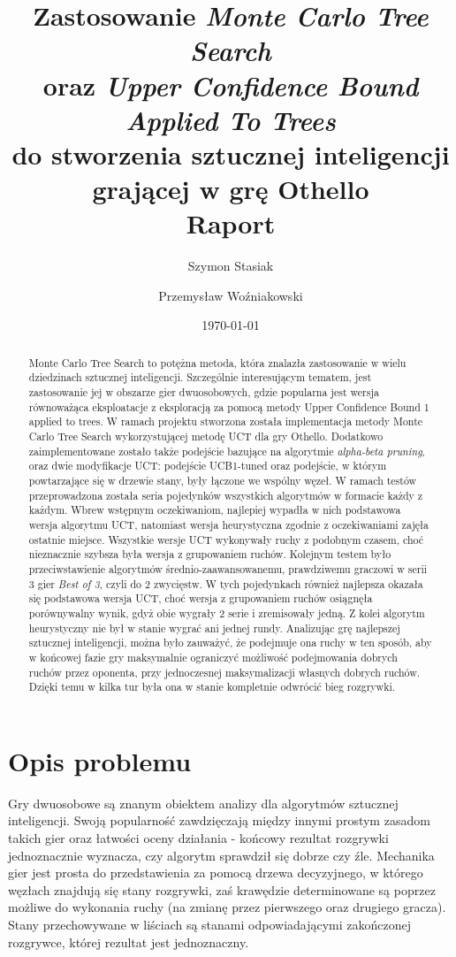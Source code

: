 \documentclass[10pt]{article}
\title{Zastosowanie \textit{Monte Carlo Tree Search} \\
oraz \textit{Upper Confidence Bound Applied To Trees} \\
do stworzenia sztucznej inteligencji grającej w grę Othello\\
\large{Raport}}
\author{Szymon Stasiak \and Przemysław Woźniakowski}
\date{\today}
\begin{document}
\maketitle
\begin{abstract}
    Monte Carlo Tree Search to potężna metoda, która znalazła zastosowanie w wielu dziedzinach sztucznej inteligencji. Szczególnie interesującym tematem, jest zastosowanie jej w obszarze gier dwuosobowych, gdzie popularna jest wersja równoważąca eksploatacje z eksploracją za pomocą metody Upper Confidence Bound 1 applied to trees. W ramach projektu stworzona została implementacja metody Monte Carlo Tree Search wykorzystującej metodę UCT dla gry Othello. Dodatkowo zaimplementowane zostało także podejście bazujące na algorytmie \textit{alpha-beta pruning}, oraz dwie modyfikacje UCT: podejście UCB1-tuned oraz podejście, w którym powtarzające się w drzewie stany, były łączone we wspólny węzeł. W ramach testów przeprowadzona została seria pojedynków wszystkich algorytmów w formacie każdy z każdym. Wbrew wstępnym oczekiwaniom, najlepiej wypadła w nich podstawowa wersja algorytmu UCT, natomiast wersja heurystyczna zgodnie z oczekiwaniami zajęła ostatnie miejsce. Wszystkie wersje UCT wykonywały ruchy z podobnym czasem, choć nieznacznie szybsza była wersja z grupowaniem ruchów. Kolejnym testem było przeciwstawienie algorytmów średnio-zaawansowanemu, prawdziwemu graczowi w serii 3 gier \textit{Best of 3}, czyli do 2 zwycięstw. W tych pojedynkach również najlepsza okazała się podstawowa wersja UCT, choć wersja z grupowaniem ruchów osiągnęła porównywalny wynik, gdyż obie wygrały 2 serie i zremisowały jedną. Z kolei algorytm heurystyczny nie był w stanie wygrać ani jednej rundy. Analizując grę najlepszej sztucznej inteligencji, można było zauważyć, że podejmuje ona ruchy w ten sposób, aby w końcowej fazie gry maksymalnie ograniczyć możliwość podejmowania dobrych ruchów przez oponenta, przy jednoczesnej maksymalizacji własnych dobrych ruchów. Dzięki temu w kilka tur była ona w stanie kompletnie odwrócić bieg rozgrywki.
\end{abstract}
\newpage

\tableofcontents

\section{Opis problemu}
\label{sec:problem}
Gry dwuosobowe są znanym obiektem analizy dla algorytmów sztucznej inteligencji. Swoją popularność zawdzięczają między innymi prostym zasadom takich gier oraz łatwości oceny działania - końcowy rezultat rozgrywki jednoznacznie wyznacza, czy algorytm sprawdził się dobrze czy źle. Mechanika gier jest prosta do przedstawienia za pomocą drzewa decyzyjnego, w którego węzłach znajdują się stany rozgrywki, zaś krawędzie determinowane są poprzez możliwe do wykonania ruchy (na zmianę przez pierwszego oraz drugiego gracza). Stany przechowywane w liściach są stanami odpowiadającymi zakończonej rozgrywce, której rezultat jest jednoznaczny.
\end{document}
